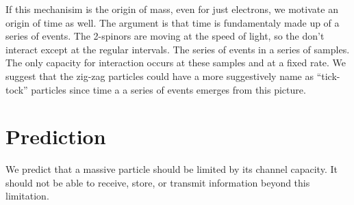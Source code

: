 \documentclass[12pt,a4paper]{article}
\begin{document}
If this mechanisim is the origin of mass, even for just electrons, we motivate an origin of time as well.  The argument is that time is fundamentaly made up of a series of events.  The 2-spinors are moving at the speed of light, so the don't interact except at the regular intervals.  The series of events in a series of samples.  The only capacity for interaction occurs at these samples and at a fixed rate.  We suggest that the zig-zag particles could have a more suggestively name as ``tick-tock'' particles since time a a series of events emerges from this picture.

\section{Prediction}
We predict that a massive particle should be limited by its channel capacity.  It should not be able to receive, store, or transmit information beyond this limitation.



\end{document}
